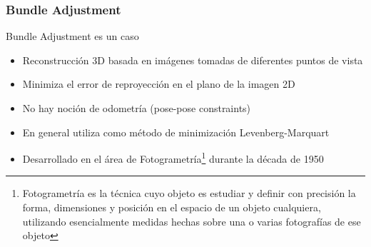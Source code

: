 \begin{frame}
    \frametitle{Bundle Adjustment}
    
    Bundle Adjustment es un caso
    
    \begin{itemize}
        \item Reconstrucción 3D basada en imágenes tomadas de diferentes puntos de vista
        \item Minimiza el error de reproyección en el plano de la imagen 2D
        \item No hay noción de odometría (pose-pose constraints)
        \item En general utiliza como método de minimización Levenberg-Marquart
        \item Desarrollado en el área de Fotogrametría\footnote{Fotogrametría es la técnica cuyo objeto es estudiar y definir con precisión la forma, dimensiones y posición en el espacio de un objeto cualquiera, utilizando esencialmente medidas hechas sobre una o varias fotografías de ese objeto} durante la década de 1950
    \end{itemize}
    
\end{frame}


